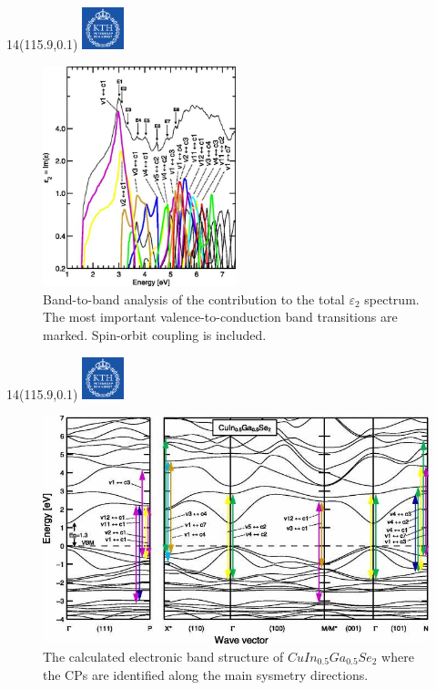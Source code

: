 \documentclass[]{beamer}
\newcommand{\MyLogo}{%
\begin{textblock}{14}(115.9,0.1)
  \includegraphics[width=1.22cm]{kth_rgb}
 \end{textblock}
}
\begin{document}
\begin{frame}
\MyLogo
\begin{figure}[H]
    \begin{center}
            \includegraphics[width=0.5\textwidth,clip]{seminar/Band_to_band_analysis}
     \end{center}
    \caption{ Band-to-band analysis of the contribution to the total $\varepsilon_2$ spectrum. The most important valence-to-conduction band transitions are marked. Spin-orbit coupling is included.}
\end{figure}
\end{frame}


\begin{frame}
\MyLogo
\begin{figure}[H]
    \begin{center}
            \includegraphics[width=1\textwidth,clip]{seminar/CPs}
     \end{center}
    \caption{The calculated electronic band structure of $CuIn_{0.5}Ga_{0.5}Se_2$ where the CPs are identified along the main sysmetry directions.}
\end{figure}
\end{frame}
\end{document}
